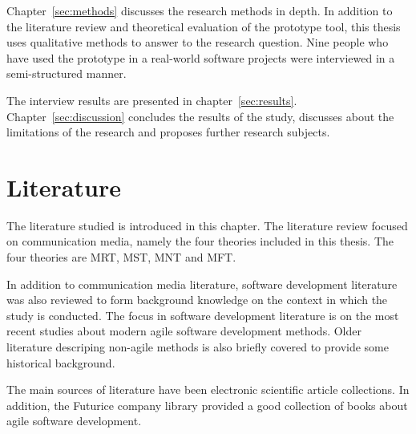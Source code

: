 \documentclass[english,12pt,a4paper,pdftex]{article}
\begin{document}
Chapter~\ref{sec:methods} discusses the research methods in depth. In addition to the literature review and theoretical evaluation of the prototype tool, this thesis uses qualitative methods to answer to the research question. Nine people who have used the prototype in a real-world software projects were interviewed in a semi-structured manner.

The interview results are presented in chapter~\ref{sec:results}. Chapter~\ref{sec:discussion} concludes the results of the study, discusses about the limitations of the research and proposes further research subjects.


\thispagestyle{empty}


\clearpage

\section{Literature}
\label{sec:literature}
\acresetall

The literature studied is introduced in this chapter. The literature review focused on communication media, namely the four theories included in this thesis. The four theories are \ac{MRT}, \ac{MST}, \ac{MNT} and \ac{MFT}.

In addition to communication media literature, software development literature was also reviewed to form background knowledge on the context in which the study is conducted. The focus in software development literature is on the most recent studies about modern agile software development methods. Older literature descriping non-agile methods is also briefly covered to provide some historical background.

The main sources of literature have been electronic scientific article collections. In addition, the Futurice company library provided a good collection of books about agile software development.

\end{document}
